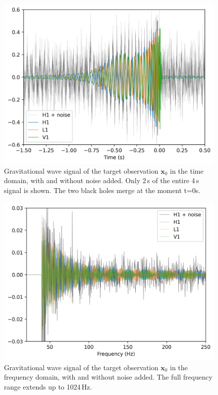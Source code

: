 \begin{figure}[tb]
  \centering
  \includegraphics[width=1\linewidth]{media/images/obs_time_domain_lowSNR.png}
  \caption{Gravitational wave signal of the target observation $\boldsymbol{x}_0$ in the time domain, with and without noise added. Only 2\,s of the entire 4\,s signal is shown. The two black holes merge at the moment t=0s.}
  \label{fig:obs_time_domain}
  \myvspacecommand
\end{figure}

\begin{figure}[tb]
  \centering
  \includegraphics[width=1\linewidth]{media/images/obs_freq_domain_lowSNR.png}
  \caption{Gravitational wave signal of the target observation $\boldsymbol{x}_0$ in the frequency domain, with and without noise added. The full frequency range extends up to 1024\,Hz.}
  \label{fig:obs_freq_domain}
  \myvspacecommand
\end{figure}

